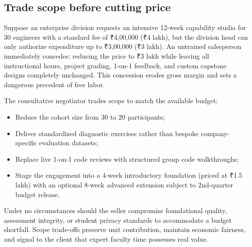 \subsection{Trade scope before cutting price}

Suppose an enterprise division requests an intensive 12-week capability studio for 30 engineers with a standard fee of ₹4,00,000 (₹4 lakh), but the division head can only authorize expenditure up to ₹3,00,000 (₹3 lakh). An untrained salesperson immediately concedes: reducing the price to ₹3 lakh while leaving all instructional hours, project grading, 1-on-1 feedback, and custom capstone designs completely unchanged. This concession erodes gross margin and sets a dangerous precedent of free labor.

The consultative negotiator trades scope to match the available budget:
\begin{itemize}
\item Reduce the cohort size from 30 to 20 participants;
\item Deliver standardized diagnostic exercises rather than bespoke company-specific evaluation datasets;
\item Replace live 1-on-1 code reviews with structured group code walkthroughs;
\item Stage the engagement into a 4-week introductory foundation (priced at ₹1.5 lakh) with an optional 8-week advanced extension subject to 2nd-quarter budget release.
\end{itemize}
Under no circumstances should the seller compromise foundational quality, assessment integrity, or student privacy standards to accommodate a budget shortfall. Scope trade-offs preserve unit contribution, maintain economic fairness, and signal to the client that expert faculty time possesses real value.
